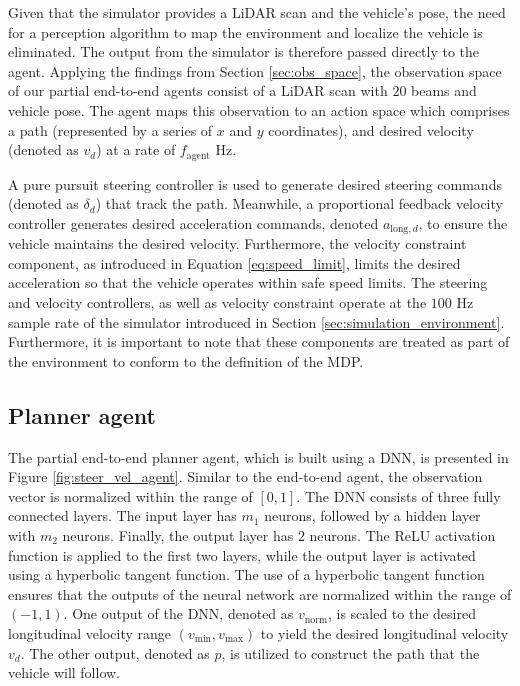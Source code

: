 Given that the simulator provides a LiDAR scan and the vehicle's pose, the need for a perception algorithm to map the environment and localize the vehicle is eliminated. 
The output from the simulator is therefore passed directly to the agent.
Applying the findings from Section \ref{sec:obs_space}, the observation space of our partial end-to-end agents consist of a LiDAR scan with $20$ beams and vehicle pose.
The agent maps this observation to an action space which comprises a path (represented by a series of $x$ and $y$ coordinates), and desired velocity (denoted as $v_{d}$) at a rate of $f_{\text{agent}}$ Hz. 


A pure pursuit steering controller is used to generate desired steering commands (denoted as $\delta_{d}$) that track the path.
Meanwhile, a proportional feedback velocity controller generates desired acceleration commands, denoted $a_{\text{long},d}$, to ensure the vehicle maintains the desired velocity.
Furthermore, the velocity constraint component, as introduced in Equation \ref{eq:speed_limit}, limits the desired acceleration so that the vehicle operates within safe speed limits. 
The steering and velocity controllers, as well as velocity constraint operate at the $100$ Hz sample rate of the simulator introduced in Section \ref{sec:simulation_environment}.
Furthermore, it is important to note that these components are treated as part of the environment to conform to the definition of the MDP. 

\subsection{Planner agent}

The partial end-to-end planner agent, which is built using a DNN, is presented in Figure \ref{fig:steer_vel_agent}. 
Similar to the end-to-end agent, the observation vector is normalized within the range of $[0,1]$.
The DNN consists of three fully connected layers. The input layer has $m_1$ neurons, followed by a hidden layer with $m_2$ neurons. Finally, the output layer has $2$ neurons. 
The ReLU activation function is applied to the first two layers, while the output layer is activated using a hyperbolic tangent function. 
The use of a hyperbolic tangent function ensures that the outputs of the neural network are normalized within the range of $(-1, 1)$.
One output of the DNN, denoted as $v_{\text{norm}}$, is scaled to the desired longitudinal velocity range $(v_{\text{min}}, v_{\text{max}})$ to yield the desired longitudinal velocity $v_{d}$. 
The other output, denoted as $p$, is utilized to construct the path that the vehicle will follow.


